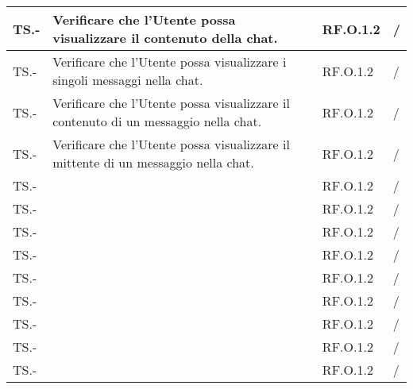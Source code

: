 \begin{adjustwidth}{-0.5cm}{-0.5cm}
\begin{longtable}{|P{1.5cm}|>{\raggedright}P{7cm}|P{2.5cm}|>{\arraybackslash}P{1.5cm}|}
		\hline TS.- & Verificare che l'Utente possa visualizzare il contenuto della chat. & RF.O.1.2 & / \\  
		\hline TS.- & Verificare che l'Utente possa visualizzare i singoli messaggi nella chat. & RF.O.1.2 & / \\  
		\hline TS.- & Verificare che l'Utente possa visualizzare il contenuto di un messaggio nella chat. & RF.O.1.2 & / \\  
		\hline TS.- & Verificare che l'Utente possa visualizzare il mittente di un messaggio nella chat. & RF.O.1.2 & / \\  
		\hline TS.- &  & RF.O.1.2 & / \\  
		\hline TS.- &  & RF.O.1.2 & / \\  
		\hline TS.- &  & RF.O.1.2 & / \\  
		\hline TS.- &  & RF.O.1.2 & / \\  
		\hline TS.- &  & RF.O.1.2 & / \\  
		\hline TS.- &  & RF.O.1.2 & / \\  
		\hline TS.- &  & RF.O.1.2 & / \\  
		\hline TS.- &  & RF.O.1.2 & / \\  
		\hline TS.- &  & RF.O.1.2 & / \\    
	\end{longtable}
\end{adjustwidth}
\egroup
